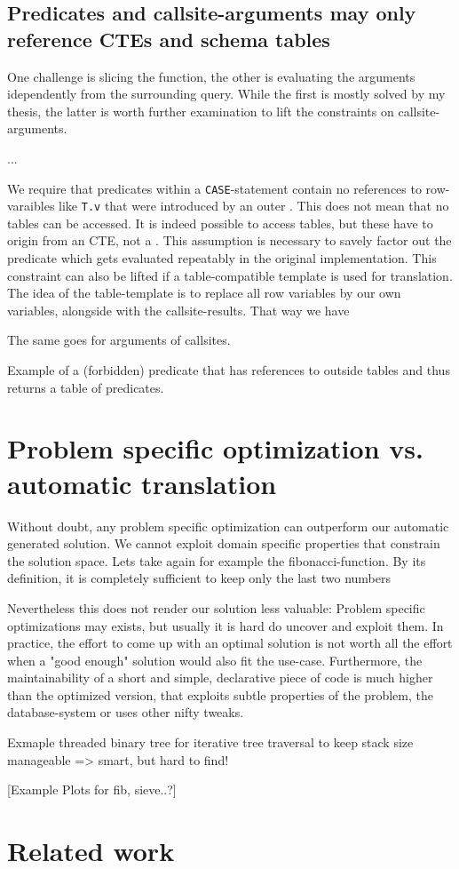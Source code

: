 \subsection{Predicates and callsite-arguments may only reference CTEs and schema tables}
One challenge is slicing the function, the other is evaluating the arguments idependently from the surrounding query. While the first is mostly solved by my thesis, the latter is worth further examination to lift the constraints on callsite-arguments.

...

We require that predicates within a \texttt{CASE}-statement contain no references to row-varaibles like \texttt{T.v} that were introduced by an outer \FROM. This does not mean that no tables can be accessed. It is indeed possible to access tables, but these have to origin from an CTE, not a \FROM. This assumption is necessary to savely factor out the predicate which gets evaluated repeatably in the original implementation. This constraint can also be lifted if a table-compatible template is used for translation. The idea of the table-template is to replace all row variables by our own variables, alongside with the callsite-results. That way we have 

The same goes for arguments of callsites.

\begin{listing}[ht]
\caption{Example of a (forbidden) predicate that has references to outside tables and thus returns a table of predicates.}
\label{lst:from_nonselfcontained}
\end{listing}

\section{Problem specific optimization vs. automatic translation}
Without doubt, any problem specific optimization can outperform our automatic generated solution. We cannot exploit domain specific properties that constrain the solution space. Lets take again for example the fibonacci-function. By its definition, it is completely sufficient to keep only the last two numbers 

Nevertheless this does not render our solution less valuable: Problem specific optimizations may exists, but usually it is hard do uncover and exploit them. In practice, the effort to come up with an optimal solution is not worth all the effort when a "good enough" solution would also fit the use-case. Furthermore, the maintainability of a short and simple, declarative piece of code is much higher than the optimized version, that exploits subtle properties of the problem, the database-system or uses other nifty tweaks.

Exmaple threaded binary tree for iterative tree traversal to keep stack size manageable => smart, but hard to find!

[Example Plots for fib, sieve..?]

\section{Related work}\label{related_work}
